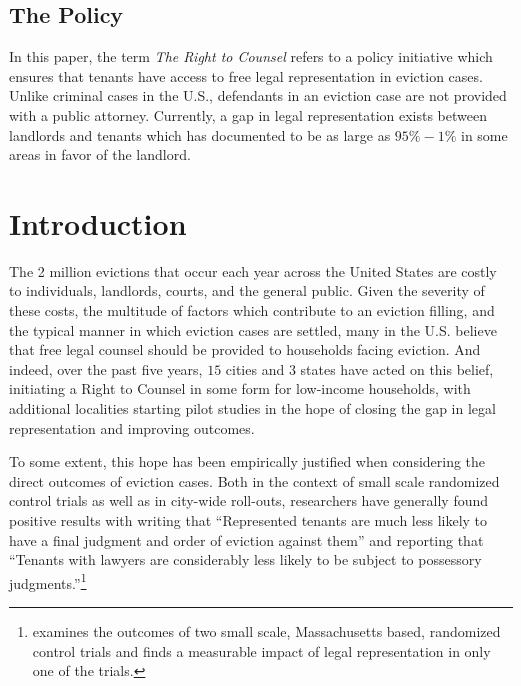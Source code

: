 \documentclass[a4paper,12pt]{article}
\begin{document}



\subsection*{The Policy}
In this paper, the term \textit{The Right to Counsel} refers to a policy initiative which ensures that tenants have access to free legal representation in eviction cases. Unlike criminal cases in the U.S., defendants in an eviction case are not provided with a public attorney. Currently, a gap in legal representation exists between landlords and tenants which \cite{collinson2022eviction} has documented to be as large as $95\%-1\%$ in some areas in favor of the landlord.

\section{Introduction}
The 2 million evictions that occur each year across the United States are costly to individuals, landlords, courts, and the general public. Given the severity of these costs, the multitude of factors which contribute to an eviction filling, and the typical manner in which eviction cases are settled, many in the U.S. believe that free legal counsel should be provided to households facing eviction. And indeed, over the past five years, $15$ cities and $3$ states have acted on this belief, initiating a Right to Counsel in some form for low-income households, with additional localities starting pilot studies in the hope of closing the gap in legal representation and improving outcomes. \par 
To some extent, this hope has been empirically justified when considering the direct outcomes of eviction cases. Both in the context of small scale randomized control trials as well as in city-wide roll-outs, researchers have generally found positive results with \cite{seron2001impact}  writing that ``Represented tenants are much less likely to have a final judgment and order of eviction against them'' and \cite{cassidy2022effects} reporting that ``Tenants with lawyers are considerably less likely to be subject to possessory judgments.''\footnote{\cite{greiner2012limits} examines the outcomes of two small scale, Massachusetts based, randomized control trials and finds a measurable impact of legal representation in only one of the trials.} \par 
\end{document}
